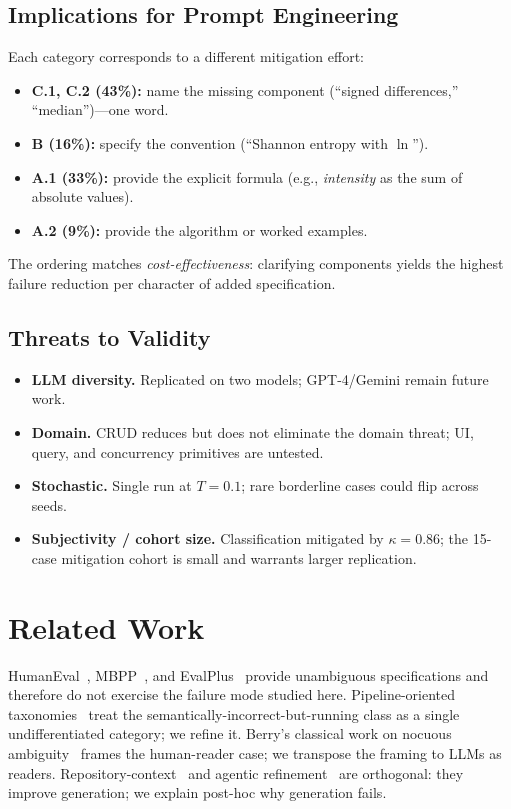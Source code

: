 \documentclass[conference]{IEEEtran}
\begin{document}
\subsection{Implications for Prompt Engineering}
Each category corresponds to a different mitigation effort:
\begin{itemize}\itemsep0pt
  \item \textbf{C.1, C.2 (43\%):} name the missing component (``signed differences,'' ``median'')---one word.
  \item \textbf{B (16\%):} specify the convention (``Shannon entropy with $\ln$'').
  \item \textbf{A.1 (33\%):} provide the explicit formula (e.g., \emph{intensity} as the sum of absolute values).
  \item \textbf{A.2 (9\%):} provide the algorithm or worked examples.
\end{itemize}
The ordering matches \emph{cost-effectiveness}: clarifying components yields the highest failure reduction per character of added specification.

\subsection{Threats to Validity}
\begin{itemize}\itemsep1pt
  \item \textbf{LLM diversity.} Replicated on two models; GPT-4/Gemini remain future work.
  \item \textbf{Domain.} CRUD reduces but does not eliminate the domain threat; UI, query, and concurrency primitives are untested.
  \item \textbf{Stochastic.} Single run at $T{=}0.1$; rare borderline cases could flip across seeds.
  \item \textbf{Subjectivity / cohort size.} Classification mitigated by $\kappa{=}0.86$; the 15-case mitigation cohort is small and warrants larger replication.
\end{itemize}

\section{Related Work}\label{sec:related}
HumanEval~\cite{chen2021codex}, MBPP~\cite{austin2021mbpp}, and EvalPlus~\cite{liu2023evalplus} provide unambiguous specifications and therefore do not exercise the failure mode studied here. Pipeline-oriented taxonomies~\cite{song2023empirical,tambon2025bugs} treat the semantically-incorrect-but-running class as a single undifferentiated category; we refine it. Berry's classical work on nocuous ambiguity~\cite{berry2008nocuous} frames the human-reader case; we transpose the framing to LLMs as readers. Repository-context~\cite{shrivastava2024repolevel} and agentic refinement~\cite{yang2024sweagent} are orthogonal: they improve generation; we explain post-hoc why generation fails.
\end{document}
